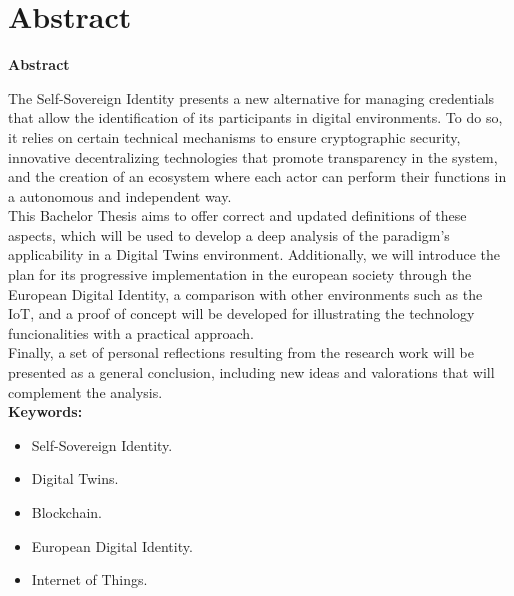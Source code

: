 \documentclass[../main.tex]{subfiles}
\begin{document}
\makeatletter
\renewenvironment{abstract}{%
    \if@twocolumn
      \section*{Abstract \\}%
    \else %
    \begin{flushright}
        {\filleft\Huge\bfseries\fontsize{48pt}{12}\selectfont Abstract\vspace{\z@}}%
        \end{flushright}
      \quotation
    \fi}
    {\if@twocolumn\else\endquotation\fi}
\makeatother

\begin{abstract}
The Self-Sovereign Identity presents a new alternative for managing credentials that allow the identification of its participants in digital environments. To do so, it relies on certain technical mechanisms to ensure cryptographic security, innovative decentralizing technologies that promote transparency in the system, and the creation of an ecosystem where each actor can perform their functions in a autonomous and independent way.
\\

This Bachelor Thesis aims to offer correct and updated definitions of these aspects, which will be used to develop a deep analysis of the paradigm's applicability in a Digital Twins environment. Additionally, we will introduce the plan for its progressive implementation in the european society through the European Digital Identity, a comparison with other environments such as the IoT, and a proof of concept will be developed for illustrating the technology funcionalities with a practical approach.
\\

Finally, a set of personal reflections resulting from the research work will be presented as a general conclusion, including new ideas and valorations that will complement the analysis.
\\

\bfseries{\large{Keywords:}} 
\begin{itemize}
    \item Self-Sovereign Identity.
    \item Digital Twins.
    \item Blockchain.
    \item European Digital Identity.
    \item Internet of Things.
\end{itemize}

\end{abstract}
\end{document}
